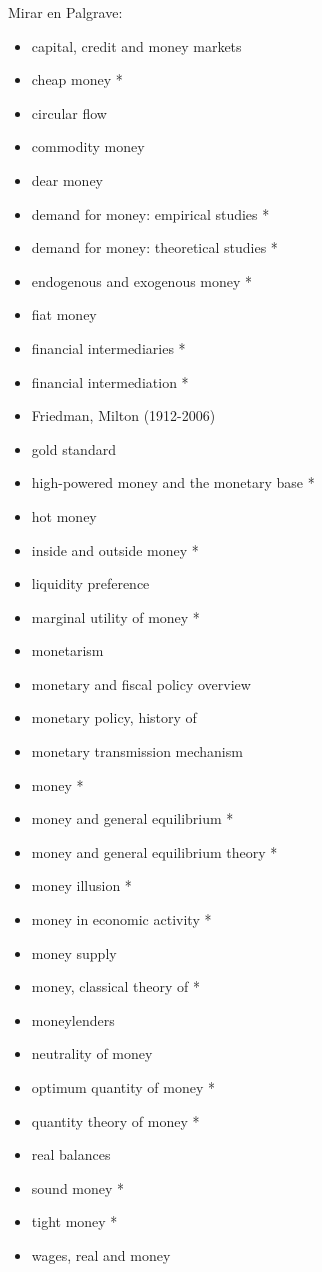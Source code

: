 \documentclass{nuevotema}
\begin{document}
Mirar en Palgrave:
\begin{itemize}
	\item capital, credit and money markets
	\item cheap money *
	\item circular flow
	\item commodity money
	\item dear money
	\item demand for money: empirical studies *
	\item demand for money: theoretical studies *
	\item endogenous and exogenous money *
	\item fiat money
	\item financial intermediaries *
	\item financial intermediation *
	\item Friedman, Milton (1912-2006)
	\item gold standard
	\item high-powered money and the monetary base *
	\item hot money
	\item inside and outside money *
	\item liquidity preference
	\item marginal utility of money *
	\item monetarism
	\item monetary and fiscal policy overview
	\item monetary policy, history of
	\item monetary transmission mechanism
	\item money * 
	\item money and general equilibrium *
	\item money and general equilibrium theory *
	\item money illusion *
	\item money in economic activity *
	\item money supply
	\item money, classical theory of *
	\item moneylenders
	\item neutrality of money
	\item optimum quantity of money *
	\item quantity theory of money *
	\item real balances
	\item sound money *
	\item tight money *
	\item wages, real and money
\end{itemize}
\end{document}
